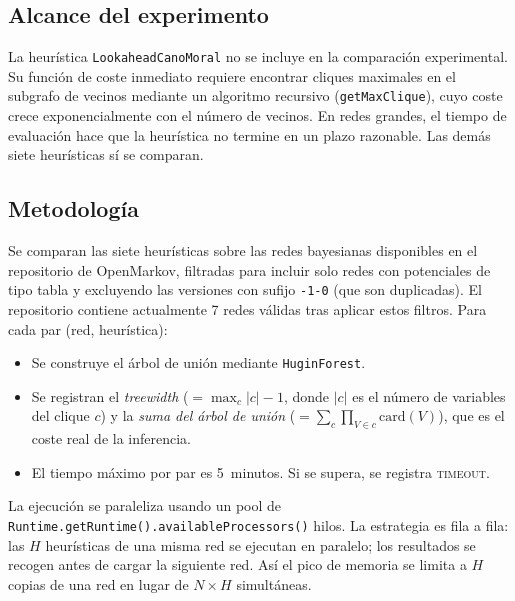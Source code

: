 \documentclass[11pt, a4paper]{article}
\begin{document}
\subsection{Alcance del experimento}

La heurística \texttt{LookaheadCanoMoral} no se incluye en la comparación experimental. Su función de coste inmediato requiere encontrar cliques maximales en el subgrafo de vecinos mediante un algoritmo recursivo (\texttt{getMaxClique}), cuyo coste crece exponencialmente con el número de vecinos. En redes grandes, el tiempo de evaluación hace que la heurística no termine en un plazo razonable. Las demás siete heurísticas sí se comparan.

\subsection{Metodología}

Se comparan las siete heurísticas sobre las redes bayesianas disponibles en el repositorio de OpenMarkov, filtradas para incluir solo redes con potenciales de tipo tabla y excluyendo las versiones con sufijo \texttt{-1-0} (que son duplicadas). El repositorio contiene actualmente 7 redes válidas tras aplicar estos filtros. Para cada par (red, heurística):

\begin{itemize}
  \item Se construye el árbol de unión mediante \texttt{HuginForest}.
  \item Se registran el \emph{treewidth} ($= \max_c |c| - 1$, donde $|c|$ es el número de variables del clique $c$) y la \emph{suma del árbol de unión} ($= \sum_c \prod_{V \in c} \mathrm{card}(V)$), que es el coste real de la inferencia.
  \item El tiempo máximo por par es 5~minutos. Si se supera, se registra \textsc{timeout}.
\end{itemize}

La ejecución se paraleliza usando un pool de \texttt{Runtime.getRuntime().\allowbreak availableProcessors()} hilos. La estrategia es fila a fila: las $H$ heurísticas de una misma red se ejecutan en paralelo; los resultados se recogen antes de cargar la siguiente red. Así el pico de memoria se limita a $H$ copias de una red en lugar de $N \times H$ simultáneas.
\end{document}
